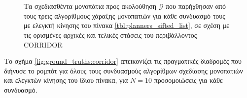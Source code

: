 \begin{figure}\centering
  \begin{subfigure}[t]{\linewidth}\hspace{-1cm}
    
  \end{subfigure}\\%
  \vspace{-1cm}
  \begin{subfigure}[t]{\linewidth}\hspace{-1cm}
    
  \end{subfigure}\\%
  \vspace{-1cm}
  \begin{subfigure}[t]{\linewidth}\hspace{-1cm}
    
  \end{subfigure}%
  \caption{\small Τα σχεδιασθέντα μονοπάτια προς ακολούθηση $\bm{\mathcal{G}}$
           που παρήχθησαν από τους τρεις αλγορίθμους χάραξης μονοπατιών για
           κάθε συνδυασμό τους με ελεγκτή κίνησης του πίνακα
           \ref{tbl:planners_sifted_list}, σε σχέση με τις ορισμένες αρχικές και
           τελικές στάσεις του περιβάλλοντος CORRIDOR}
  \label{fig:global_plans:corridor}
\end{figure}

Το σχήμα \ref{fig:ground_truths:corridor} απεικονίζει τις πραγματικές διαδρομές
που διήνυσε το ρομπότ για όλους τους συνδυασμούς αλγορίθμων σχεδίασης μονοπατιών
και ελεγκτών κίνησης του ίδιου πίνακα, για $N=10$ προσομοιώσεις για κάθε
συνδυασμό.


